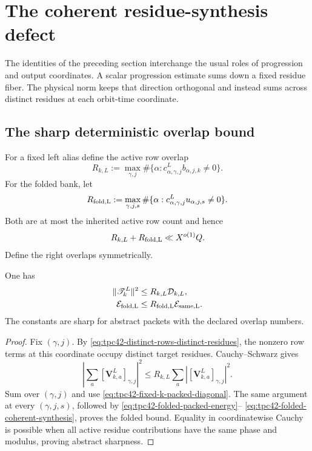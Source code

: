 \section{The coherent residue-synthesis defect}
\label{sec:tpc42-coherent-synthesis}

The identities of the preceding section interchange the usual roles of
progression and output coordinates.  A scalar progression estimate sums
down a fixed residue fiber.  The physical norm keeps that direction
orthogonal and instead sums across distinct residues at each orbit-time
coordinate.

\subsection{The sharp deterministic overlap bound}

For a fixed left alias define the active row overlap
\begin{equation}
 R_{k,L}
 :=\max_{\gamma,j}
 \#\{\alpha:
 c^L_{\alpha,\gamma,j}b_{\alpha,j,k}\ne0\}.
 \label{eq:tpc42-fixed-k-overlap}
\end{equation}
For the folded bank, let
\begin{equation}
 R_{\rm fold,L}
 :=\max_{\gamma,j,s}
 \#\{\alpha:
 c^L_{\alpha,\gamma,j}u_{\alpha,j,s}\ne0\}.
 \label{eq:tpc42-folded-overlap}
\end{equation}
Both are at most the inherited active row count and hence
\begin{equation}
 R_{k,L}+R_{\rm fold,L}\ll X^{o(1)}Q.
 \label{eq:tpc42-overlap-Q}
\end{equation}
Define the right overlaps symmetrically.

\begin{proposition}
\label{prop:tpc42-deterministic-synthesis}
One has
\begin{align}
 \|\mathscr T_k^L\|^2
 &\le R_{k,L}\mathcal D_{k,L},
 \label{eq:tpc42-fixed-k-overlap-bound}\\
 \mathcal E_{\rm fold,L}
 &\le R_{\rm fold,L}\mathcal E_{\rm same,L}.
 \label{eq:tpc42-folded-overlap-bound}
\end{align}
The constants are sharp for abstract packets with the declared overlap
numbers.
\end{proposition}

\begin{proof}
Fix \((\gamma,j)\).  By
\eqref{eq:tpc42-distinct-rows-distinct-residues}, the nonzero row terms at
this coordinate occupy distinct target residues.  Cauchy--Schwarz gives
\begin{equation}
 \left|\sum_a[\mathbf V_{k,a}^L]_{\gamma,j}\right|^2
 \le R_{k,L}\sum_a
 |[\mathbf V_{k,a}^L]_{\gamma,j}|^2.
 \label{eq:tpc42-coordinate-Cauchy}
\end{equation}
Sum over \((\gamma,j)\) and use
\eqref{eq:tpc42-fixed-k-packed-diagonal}.  The same argument at every
\((\gamma,j,s)\), followed by
\eqref{eq:tpc42-folded-packed-energy}--
\eqref{eq:tpc42-folded-coherent-synthesis}, proves the folded bound.
Equality in coordinatewise Cauchy is possible when all active residue
contributions have the same phase and modulus, proving abstract
sharpness.
\end{proof}

